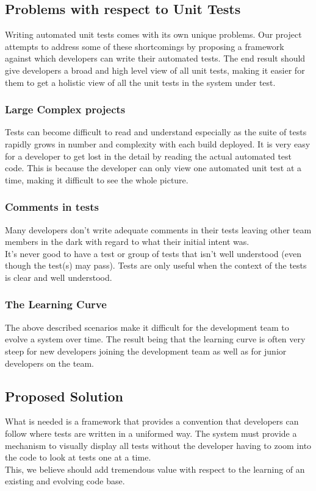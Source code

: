 \documentclass[a4paper,12pt]{article}
\begin{document}
\subsection{Problems with respect to Unit Tests}
Writing automated unit tests comes with its own unique problems. Our project attempts to address some of these shortcomings by proposing a framework against which developers can write their automated tests. The end result should give developers a broad and high level view of all unit tests, making it easier for them to get a holistic view of all the unit tests in the system under test.
\subsubsection{Large Complex projects}
Tests can become difficult to read and understand especially as the suite of tests rapidly grows in number and complexity with each build deployed. It is very easy for a developer to get lost in the detail by reading the actual automated test code. This is because the developer can only view one automated unit test at a time, making it difficult to see the whole picture. 
\subsubsection{Comments in tests}
Many developers don't write adequate comments in their tests leaving other team members in the dark with regard to what their initial intent was.\\
\linebreak
It's never good to have a test or group of tests that isn't well understood (even though the test(s) may pass). Tests are only useful when the context of the tests is clear and well understood.  
\subsubsection{The Learning Curve}
The above described scenarios make it difficult for the development team to evolve a system over time. The result being that the learning curve is often very steep for new developers joining the development team as well as for junior developers on the team.
\subsection{Proposed Solution}
What is needed is a framework that provides a convention that developers can follow where tests are written in a uniformed way. The system must provide a mechanism to visually display all tests without the developer having to zoom into the code to look at tests one at a time.\\
\linebreak
This, we believe should add tremendous value with respect to the learning of an existing and evolving code base.
\end{document}
